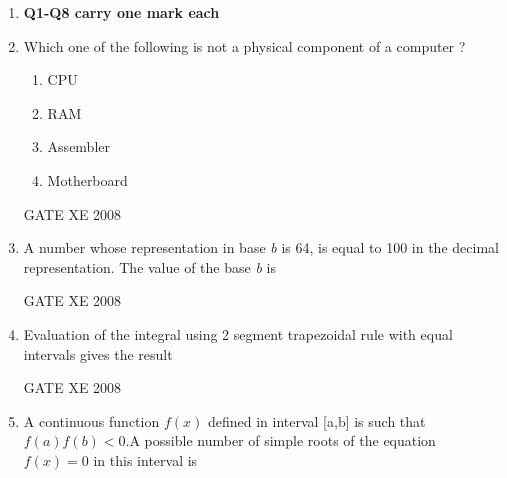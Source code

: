 \documentclass[12pt]{article}
\begin{document}
\begin{enumerate}[label=Q\arabic*.]
\item[] \textbf{Q1-Q8 carry one mark each}
\item  Which one of the following is not a physical component of a computer ?

\begin{enumerate}[label=(\Alph*)]

\item  CPU 
\item  RAM
\item  Assembler 
\item  Motherboard
\end{enumerate}

GATE XE 2008
\item A number whose representation in base \textit{b}  is 64, is equal to 100 in the decimal representation. The value of the base \textit{b} is

\begin{enumerate}[label=(\Alph*)]
\end{enumerate}

GATE XE 2008
\item Evaluation of the integral \newline using 2 segment trapezoidal rule with equal intervals gives the result

\begin{enumerate}[label=(\Alph*)]
\end{enumerate}

GATE XE 2008
\item A continuous function $f(x)$ defined in interval [a,b] is such that $f(a)f(b)<0$.A possible number of simple roots of the equation $f(x)=0$ in this interval is

\begin{enumerate}[label=(\Alph*)]
\end{enumerate}


\end{enumerate}
\end{document}
